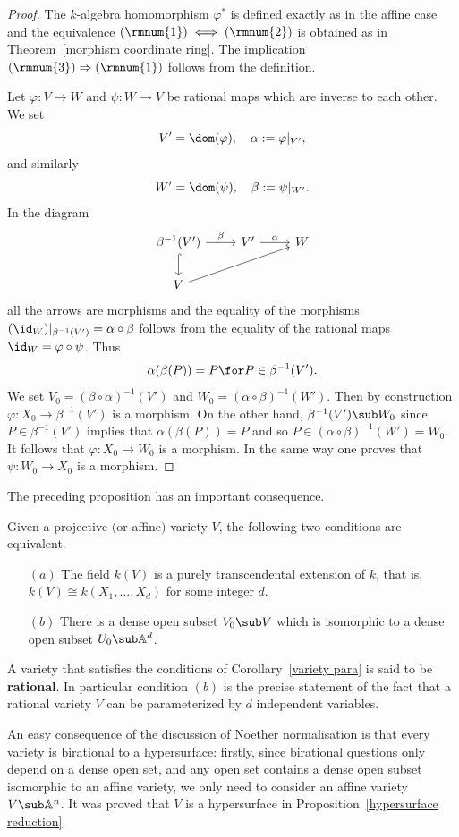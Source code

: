 \begin{proof}
The $k$-algebra homomorphism $\varphi^*$ is defined exactly as in the affine case and the equivalence $(\rmnum{1})\iff(\rmnum{2})$ is obtained as in Theorem~\ref{morphism coordinate ring}. The implication $(\rmnum{3})\Rightarrow(\rmnum{1})$ follows from the definition.\par
Let $\varphi:V\to W$ and $\psi:W\to V$ be rational maps which are inverse
to each other. We set
\[V'=\dom(\varphi),\quad \alpha:=\varphi|_{V'},\]
and similarly
\[W'=\dom(\psi),\quad \beta:=\psi|_{W'}.\]
In the diagram
\[\begin{tikzcd}
\beta^{-1}(V')\ar[d,hook]\ar[r,"\beta"]&V'\ar[r,"\alpha"]&W\\
V\ar[rru]
\end{tikzcd}\]
all the arrows are morphisms and the equality of the morphisms $(\id_{W})|_{\beta^{-1}(V')}=\alpha\circ\beta$ follows from the equality of the rational maps $\id_W=\varphi\circ\psi$. Thus
\[\alpha(\beta(P))=P\for P\in\beta^{-1}(V').\]
We set $V_0=(\beta\circ\alpha)^{-1}(V')$ and $W_0=(\alpha\circ\beta)^{-1}(W')$. Then by construction $\varphi:X_0\to\beta^{-1}(V')$ is a morphism. On the other hand, $\beta^{-1}(V')\sub W_0$ since $P\in\beta^{-1}(V')$ implies that $\alpha(\beta(P))=P$ and so $P\in (\alpha\circ\beta)^{-1}(W')=W_0$. It follows that $\varphi:X_0\to W_0$ is a morphism. In the same way one proves that $\psi:W_0\to X_0$ is a morphism.
\end{proof}
The preceding proposition has an important consequence.
\begin{corollary}\label{variety para}
Given a projective $($or affine$)$ variety $V$, the following two conditions are equivalent.
\begin{itemize}
\item[$(a)$] The field $k(V)$ is a purely transcendental extension of $k$, that is, $k(V)\cong k(X_1,\dots,X_d)$ for some integer $d$.
\item[$(b)$] There is a dense open subset $V_0\sub V$ which is isomorphic to a dense open subset $U_0\sub\mathbb{A}^d$.
\end{itemize}
\end{corollary}
A variety that satisfies the conditions of Corollary~\ref{variety para} is said to be \textbf{rational}. In particular condition $(b)$ is the precise statement of the fact that a rational variety $V$ can be parameterized by $d$ independent variables.\par
An easy consequence of the discussion of Noether normalisation is that every variety is birational to a hypersurface: firstly, since birational questions only depend on a dense open set, and any open set contains a dense open subset isomorphic to an affine variety, we only need to consider an affine variety $V\sub\mathbb{A}^n$. It was proved that $V$ is a hypersurface in Proposition~\ref{hypersurface reduction}.

